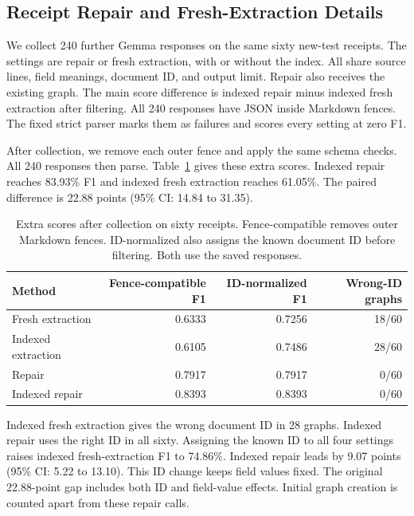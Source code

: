 \subsection{Receipt Repair and Fresh-Extraction Details}
\label{app:reextraction_diagnostics}

We collect 240 further Gemma responses on the same sixty new-test receipts.
The settings are repair or fresh extraction, with or without the index.
All share source lines, field meanings, document ID, and output limit.
Repair also receives the existing graph. The main score difference is
indexed repair minus indexed fresh extraction after filtering.
All 240 responses have JSON inside Markdown fences.
The fixed strict parser marks them as failures and scores every setting
at zero F1.

After collection, we remove each outer fence and apply the same schema
checks. All 240 responses then parse.
Table~\ref{tab:reextraction_recovery} gives these extra scores.
Indexed repair reaches 83.93\% F1 and indexed fresh extraction reaches
61.05\%. The paired difference is 22.88 points
(95\% CI: 14.84 to 31.35).

\begin{table}[t]
\centering
\caption{Extra scores after collection on sixty receipts. Fence-compatible removes outer Markdown fences. ID-normalized also assigns the known document ID before filtering. Both use the saved responses.}
\label{tab:reextraction_recovery}
\small
\begin{tabular}{lrrr}
\toprule
Method & Fence-compatible F1 & ID-normalized F1 & Wrong-ID graphs \\
\midrule
Fresh extraction & 0.6333 & 0.7256 & 18/60 \\
Indexed extraction & 0.6105 & 0.7486 & 28/60 \\
Repair & 0.7917 & 0.7917 & 0/60 \\
Indexed repair & 0.8393 & 0.8393 & 0/60 \\
\bottomrule
\end{tabular}
\end{table}

Indexed fresh extraction gives the wrong document ID in 28 graphs.
Indexed repair uses the right ID in all sixty.
Assigning the known ID to all four settings raises indexed fresh-extraction
F1 to 74.86\%. Indexed repair leads by 9.07 points
(95\% CI: 5.22 to 13.10). This ID change keeps field values fixed.
The original 22.88-point gap includes both ID and field-value effects.
Initial graph creation is counted apart from these repair calls.

